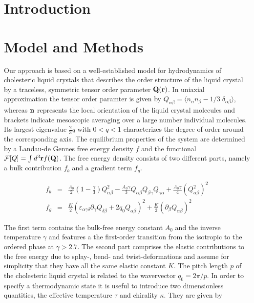 \documentclass[aps,pre,twocolumn,groupedaddress]{revtex4-1}
\begin{document}
\section{Introduction}
\section{Model and Methods}

Our approach is based on a well-established model for hydrodynamics of cholesteric liquid crystals \cite{Beris:1994,Olmsted:1999} that describes the order structure of the liquid crystal by a traceless, symmetric tensor order parameter ${\bf Q}({\bf r})$. 
In uniaxial approximation the tensor order paramter is given by $Q_{\alpha \beta}=\langle n_\alpha n_\beta - 1/3\; \delta_{\alpha\beta}\rangle$, whereas ${\bf n}$ represents the local orientation of the liquid crystal molecules and brackets indicate mesoscopic averaging over a large number individual molecules.
Its largest eigenvalue $\frac{2}{3}q$ with $0<q<1$ characterizes the degree of order around the corresponding axis. 
The equilibrium properties of the system are determined by a Landau-de Gennes free energy density $f$ and the functional ${\cal F}[Q]=\int d^3{\bf r} f({\bf Q})$.
The free energy density consists of two different parts, namely a bulk contribution $f_b$ and a gradient term $f_g$.

\begin{eqnarray}
f_b&=&\frac{A_0}{2}\left(1-\frac{\gamma}{3}\right) Q_{\alpha \beta}^2-\frac{A_0 \gamma}{3}Q_{\alpha \beta} Q_{\beta \gamma} Q_{\gamma \alpha}+\frac{A_0 \gamma}{4}(Q_{\alpha \beta}^2)^2\nonumber\\
f_g&=&\frac{K}{2}(\varepsilon_{\alpha\gamma\delta} \partial_\gamma Q_{\delta\beta}+2 q_0 Q_{\alpha \beta})^2+\frac{K}{2}(\partial_\beta Q_{\alpha \beta})^2\label{eqn1}
\end{eqnarray}

The first term contains the bulk-free energy constant $A_0$ and the inverse temperature $\gamma$ and features a the first-order transition from the isotropic to the ordered phase at $\gamma>2.7$.
The second part comprises the elastic contributions to the free energy due to splay-, bend- and twist-deformations and assume for simplicity that they have all the same elastic constant $K$.
The pitch length $p$ of the cholesteric liquid crystal is related to the wavervector $q_0=2\pi/p$.
In order to specify a thermodynamic state it is useful to introduce two dimensionless quantities, the effective temperature $\tau$ and chirality $\kappa$.
They are given by 
\end{document}
